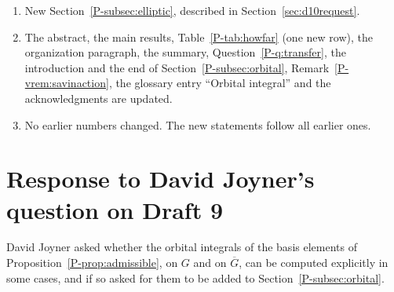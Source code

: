 \documentclass[12pt,letterpaper]{amsart}
\newcommand{\Gbar}{\overline{G}}
\begin{document}
\begin{enumerate}[leftmargin=1.5em]
\item New Section~\ref{P-subsec:elliptic}, described in
Section~\ref{sec:d10request}.
\item The abstract, the main results, Table~\ref{P-tab:howfar} (one new
row), the organization paragraph, the summary,
Question~\ref{P-q:transfer}, the introduction and the end of
Section~\ref{P-subsec:orbital}, Remark~\ref{P-vrem:savinaction}, the
glossary entry ``Orbital integral'' and the acknowledgments are updated.
\item No earlier numbers changed. The new statements follow all
earlier ones.
\end{enumerate}

\section{Response to David Joyner's question on Draft 9}
\label{sec:d9request}

David Joyner asked whether the orbital integrals of the basis elements
of Proposition~\ref{P-prop:admissible}, on $G$ and on $\Gbar$, can be
computed explicitly in some cases, and if so asked for them to be
added to Section~\ref{P-subsec:orbital}.
\end{document}
